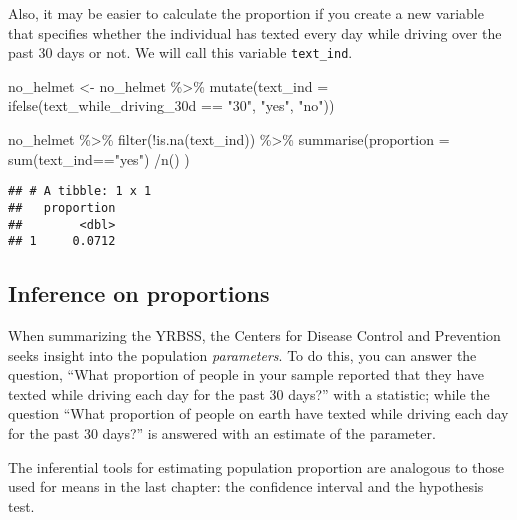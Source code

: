 \documentclass[
]{article}
\newenvironment{Shaded}{\begin{snugshade}}{\end{snugshade}}
\newcommand{\AttributeTok}[1]{\textcolor[rgb]{0.77,0.63,0.00}{#1}}
\newcommand{\FunctionTok}[1]{\textcolor[rgb]{0.00,0.00,0.00}{#1}}
\newcommand{\NormalTok}[1]{#1}
\newcommand{\OtherTok}[1]{\textcolor[rgb]{0.56,0.35,0.01}{#1}}
\newcommand{\SpecialCharTok}[1]{\textcolor[rgb]{0.00,0.00,0.00}{#1}}
\newcommand{\StringTok}[1]{\textcolor[rgb]{0.31,0.60,0.02}{#1}}
\begin{document}
Also, it may be easier to calculate the proportion if you create a new
variable that specifies whether the individual has texted every day
while driving over the past 30 days or not. We will call this variable
\texttt{text\_ind}.

\begin{Shaded}
\begin{Highlighting}[]
\NormalTok{no\_helmet }\OtherTok{\textless{}{-}}\NormalTok{ no\_helmet }\SpecialCharTok{\%\textgreater{}\%}
  \FunctionTok{mutate}\NormalTok{(}\AttributeTok{text\_ind =} \FunctionTok{ifelse}\NormalTok{(text\_while\_driving\_30d }\SpecialCharTok{==} \StringTok{"30"}\NormalTok{, }\StringTok{"yes"}\NormalTok{, }\StringTok{"no"}\NormalTok{))}


\NormalTok{no\_helmet }\SpecialCharTok{\%\textgreater{}\%}
 \FunctionTok{filter}\NormalTok{(}\SpecialCharTok{!}\FunctionTok{is.na}\NormalTok{(text\_ind)) }\SpecialCharTok{\%\textgreater{}\%}
\FunctionTok{summarise}\NormalTok{(}\AttributeTok{proportion =} \FunctionTok{sum}\NormalTok{(text\_ind}\SpecialCharTok{==}\StringTok{"yes"}\NormalTok{) }\SpecialCharTok{/}\FunctionTok{n}\NormalTok{() )}
\end{Highlighting}
\end{Shaded}

\begin{verbatim}
## # A tibble: 1 x 1
##   proportion
##        <dbl>
## 1     0.0712
\end{verbatim}

\hypertarget{inference-on-proportions}{%
\subsection{Inference on proportions}\label{inference-on-proportions}}

When summarizing the YRBSS, the Centers for Disease Control and
Prevention seeks insight into the population \emph{parameters}. To do
this, you can answer the question, ``What proportion of people in your
sample reported that they have texted while driving each day for the
past 30 days?'' with a statistic; while the question ``What proportion
of people on earth have texted while driving each day for the past 30
days?'' is answered with an estimate of the parameter.

The inferential tools for estimating population proportion are analogous
to those used for means in the last chapter: the confidence interval and
the hypothesis test.
\end{document}
